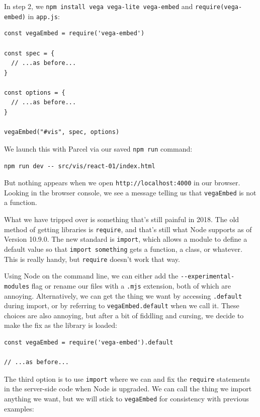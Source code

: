 In step 2, we \texttt{npm\ install\ vega\ vega-lite\ vega-embed} and
\texttt{require(\textquotesingle{}vega-embed\textquotesingle{})} in
\texttt{app.js}:

\begin{verbatim}
const vegaEmbed = require('vega-embed')

const spec = {
  // ...as before...
}

const options = {
  // ...as before...
}

vegaEmbed("#vis", spec, options)
\end{verbatim}

We launch this with Parcel via our saved \texttt{npm\ run} command:

\begin{verbatim}
npm run dev -- src/vis/react-01/index.html
\end{verbatim}

But nothing appears when we open \texttt{http://localhost:4000} in our
browser. Looking in the browser console, we see a message telling us
that \texttt{vegaEmbed} is not a function.

What we have tripped over is something that's still painful in 2018. The
old method of getting libraries is \texttt{require}, and that's still
what Node supports as of Version 10.9.0. The new standard is
\texttt{import}, which allows a module to define a default value so that
\texttt{import\ \textquotesingle{}something\textquotesingle{}} gets a
function, a class, or whatever. This is really handy, but
\texttt{require} doesn't work that way.

Using Node on the command line, we can either add the
\texttt{-\/-experimental-modules} flag or rename our files with a
\texttt{.mjs} extension, both of which are annoying. Alternatively, we
can get the thing we want by accessing \texttt{.default} during import,
or by referring to \texttt{vegaEmbed.default} when we call it. These
choices are also annoying, but after a bit of fiddling and cursing, we
decide to make the fix as the library is loaded:

\begin{verbatim}
const vegaEmbed = require('vega-embed').default

// ...as before...
\end{verbatim}

The third option is to use \texttt{import} where we can and fix the
\texttt{require} statements in the server-side code when Node is
upgraded. We can call the thing we import anything we want, but we will
stick to \texttt{vegaEmbed} for consistency with previous examples:

